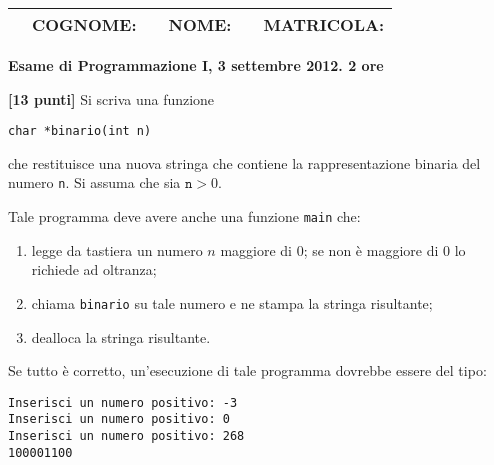 \documentclass{article}[10pt]
\newcounter{esnu}
\newenvironment{esercizio}{\medskip \noindent {\bf Esercizio\addtocounter{esnu}{1} \arabic{esnu}}}{}
\begin{document}
\begin{tabular}{llclcr}
 \hspace{-35pt} &{\bf COGNOME:} & \hspace{100pt}        &{\bf NOME:}    & \hspace{100pt}        &{\bf MATRICOLA:}\hspace{35pt} \\
\hline
\end{tabular}
\begin{center} {\bf Esame di Programmazione I, 3 settembre 2012. 2 ore}\end{center}

\begin{esercizio}
\textbf{[13 punti]}
Si scriva una funzione

\begin{verbatim}
char *binario(int n)
\end{verbatim}

\noindent
che restituisce una nuova stringa che contiene la rappresentazione binaria del numero \texttt{n}.
Si assuma che sia $\mathtt{n}>0$.

Tale programma deve avere anche una funzione \texttt{main} che:
\begin{enumerate}
\item legge da tastiera un numero $n$ maggiore di $0$; se non \`e maggiore di 0 lo richiede ad oltranza;
\item chiama \texttt{binario} su tale numero e ne stampa la stringa risultante;
\item dealloca la stringa risultante.
\end{enumerate}

Se tutto \`e corretto, un'esecuzione di tale programma dovrebbe essere del tipo:

{\small
\begin{verbatim}
Inserisci un numero positivo: -3
Inserisci un numero positivo: 0
Inserisci un numero positivo: 268
100001100
\end{verbatim}
}

\end{esercizio}
\end{document}
